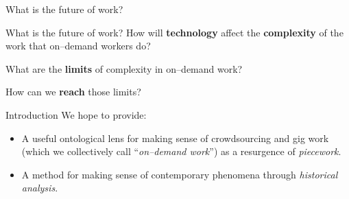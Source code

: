\documentclass[presentation]{subfiles}
\begin{document}
\begin{frame}[standout]
    What is the future of work?
\end{frame}

\begin{frame}{What is the future of work?}
    How will \textbf{technology} affect the \textbf{complexity} of the work that on--demand workers do?

    What are the \textbf{limits} of complexity in on--demand work?

    How can we \textbf{reach} those limits?
\end{frame}





\notinsubfile{
}


\begin{frame}{Introduction}
  We hope to provide:
      \begin{itemize}
        \item A useful ontological lens for making sense of crowdsourcing and gig work (which we collectively call ``\textit{on--demand work}'') as a resurgence of \textit{piecework}.
        \item A method for making sense of contemporary phenomena through \textit{historical analysis}.
      \end{itemize}
\end{frame}
\end{document}
